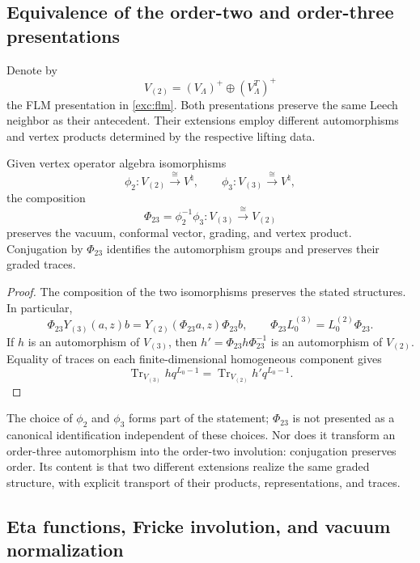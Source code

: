 \subsection{Equivalence of the order-two and order-three presentations}
\label{km:equivalencia-dos-tres}

Denote by
\[
 V_{(2)}=(V_\Lambda)^+\oplus(V_\Lambda^T)^+
\]
the FLM presentation in \eqref{exc:flm}. Both presentations preserve
the same Leech neighbor as their antecedent. Their extensions employ
different automorphisms and vertex products determined by
the respective lifting data.

\begin{theorem}
\label{km:equivalencia-voa}
Given vertex operator algebra isomorphisms
\[
 \phi_2:V_{(2)}\xrightarrow{\ \cong\ }V^\natural,
 \qquad
 \phi_3:V_{(3)}\xrightarrow{\ \cong\ }V^\natural,
\]
the composition
\begin{equation}
 \Phi_{23}=\phi_2^{-1}\phi_3:
 V_{(3)}\xrightarrow{\ \cong\ }V_{(2)}
 \label{km:Phi23}
\end{equation}
preserves the vacuum, conformal vector, grading, and vertex
product. Conjugation by \(\Phi_{23}\) identifies the automorphism
groups and preserves their graded traces.
\end{theorem}
\begin{proof}
The composition of the two isomorphisms preserves the stated
structures. In particular,
\[
 \Phi_{23}Y_{(3)}(a,z)b
 =Y_{(2)}(\Phi_{23}a,z)\Phi_{23}b,
 \qquad
 \Phi_{23}L_0^{(3)}=L_0^{(2)}\Phi_{23}.
\]
If \(h\) is an automorphism of \(V_{(3)}\), then
\(h' =\Phi_{23}h\Phi_{23}^{-1}\) is an automorphism of
\(V_{(2)}\). Equality of traces on each finite-dimensional homogeneous
component gives
\[
 \operatorname{Tr}_{V_{(3)}}h q^{L_0-1}
 =\operatorname{Tr}_{V_{(2)}}h' q^{L_0-1}.
\]
\end{proof}

The choice of \(\phi_2\) and \(\phi_3\) forms part of the statement;
\(\Phi_{23}\) is not presented as a canonical identification
independent of these choices. Nor does it transform an order-three
automorphism into the order-two involution: conjugation preserves
order. Its content is that two different extensions realize the
same graded structure, with explicit transport of their products,
representations, and traces.

\subsection{Eta functions, Fricke involution, and vacuum normalization}
\label{km:fricke}


